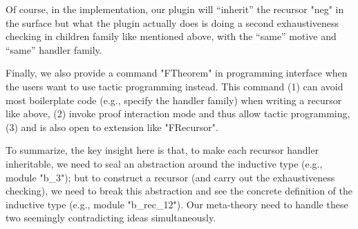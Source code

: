 Of course, in the implementation, our plugin will ``inherit'' the
recursor "neg" in the surface 
but what the plugin actually does is doing a second exhaustiveness
checking in children family like mentioned above, with the ``same'' motive and ``same'' handler family.



 







Finally, we also provide a command "FTheorem" in programming interface when the users want to use tactic
programming instead. This command (1) can avoid most boilerplate code (e.g., specify the handler family) when writing a recursor like above, (2) invoke
proof interaction mode and thus allow tactic programming, (3) and is also open to extension like "FRecursor".

To summarize, the key insight here is that, to make each recursor
handler inheritable, we need to seal an abstraction around the inductive
type (e.g., module "b_3"); but to construct a recursor (and carry out the
exhaustiveness checking), we need to break this abstraction and see the
concrete definition of the inductive type (e.g., module "b_rec_12"). Our
meta-theory need to handle these two seemingly contradicting ideas
simultaneously. 


